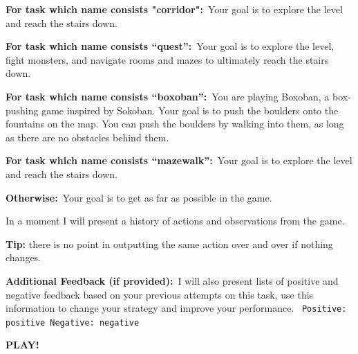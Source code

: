 \begin{MyGreenBox}[frametitle={\textbf{Iteration 0 MiniHack Prompt}}]
\textbf{For task which name consists "corridor":}\
Your goal is to explore the level and reach the stairs down.

\textbf{For task which name consists “quest”:}\
Your goal is to explore the level, fight monsters, and navigate rooms and mazes to ultimately reach the stairs down.

\textbf{For task which name consists “boxoban”:}\
You are playing Boxoban, a box-pushing game inspired by Sokoban. Your goal is to push the boulders onto the fountains on the map. You can push the boulders by walking into them, as long as there are no obstacles behind them.

\textbf{For task which name consists “mazewalk”:}\
Your goal is to explore the level and reach the stairs down.

\textbf{Otherwise:}\
Your goal is to get as far as possible in the game.

In a moment I will present a history of actions and observations from the game.

\textbf{Tip:} there is no point in outputting the same action over and over if nothing changes.



\textbf{Additional Feedback (if provided):}\
I will also present lists of positive and negative feedback based on your previous attempts on this task, use this information to change your strategy and improve your performance. \
\texttt{Positive: {positive}}\
\texttt{Negative: {negative}}

\textbf{PLAY!}
\end{MyGreenBox}

